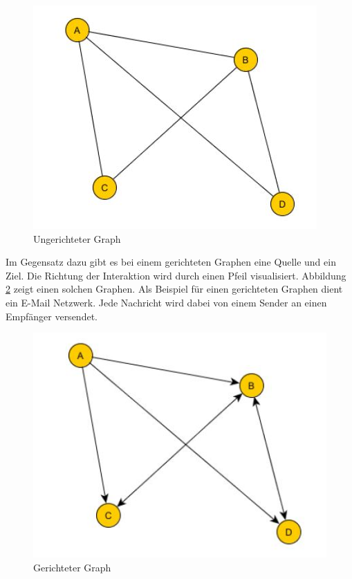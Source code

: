 \begin{figure}[h]
    \centering
    \includegraphics{resources/img_graph_undirected.JPG}
    \caption{Ungerichteter Graph}
    \label{fig:graph_undirected}
\end{figure}

Im Gegensatz dazu gibt es bei einem gerichteten Graphen eine Quelle und ein Ziel. Die Richtung der Interaktion wird durch einen Pfeil visualisiert.
Abbildung \ref{fig:graph_directed} zeigt einen solchen Graphen.
Als Beispiel für einen gerichteten Graphen dient ein E-Mail Netzwerk. Jede Nachricht wird dabei von einem Sender an einen Empfänger versendet.

\begin{figure}[h]
    \centering
    \includegraphics{resources/img_graph_directed.JPG}
    \caption{Gerichteter Graph}
    \label{fig:graph_directed}
\end{figure}

